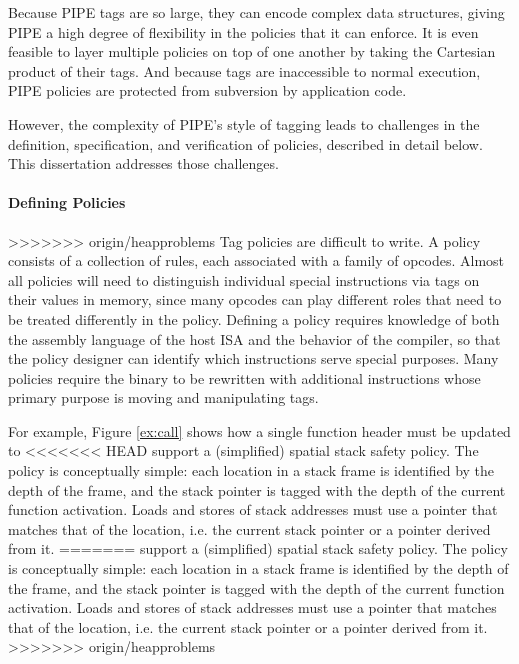 \documentclass{report}
\begin{document}
Because PIPE tags are so large, they can encode complex data structures, giving PIPE a high
degree of flexibility in the policies that it can enforce. It is even feasible to layer
multiple policies on top of one another by taking the Cartesian product of their tags.
And because tags are inaccessible to normal execution, PIPE policies are protected from
subversion by application code.

However, the complexity of PIPE's style of tagging leads to challenges in the definition,
specification, and verification of policies, described in detail below. This dissertation
addresses those challenges.

\paragraph{Defining Policies}

>>>>>>> origin/heapproblems
Tag policies are difficult to write.
A policy consists of a collection of rules, each associated with a family of opcodes.
Almost all policies will need to distinguish
individual special instructions via tags on their values in memory, since many opcodes can
play different roles that need to be
treated differently in the policy. Defining a policy requires knowledge of both the assembly
language of the host ISA and the behavior of the compiler, so that the policy designer can
identify which instructions serve special purposes. Many policies require the binary
to be rewritten with additional instructions whose primary purpose is moving and manipulating
tags.

For example, Figure \ref{ex:call} shows how a single function header must be updated to
<<<<<<< HEAD
support a (simplified) spatial stack safety policy. %
The policy is conceptually simple:
each location in a stack frame is identified by the depth of the frame, and the stack pointer
is tagged with the depth of the current function activation.  Loads and stores of stack
addresses must use a pointer that matches that of the location, i.e. the current stack pointer
or a pointer derived from it. %
=======
support a (simplified) spatial stack safety policy. The policy is conceptually simple:
each location in a stack frame is identified by the depth of the frame, and the stack pointer
is tagged with the depth of the current function activation.  Loads and stores of stack
addresses must use a pointer that matches that of the location, i.e. the current stack pointer
or a pointer derived from it.
>>>>>>> origin/heapproblems
\end{document}
